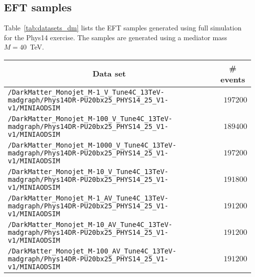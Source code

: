 \subsection{EFT samples}
Table~\ref{tab:datasets_dm} lists the EFT samples generated using full simulation for the Phys14 exercise. The samples are generated using a mediator mass $M=40$~TeV.
\begin{sidewaystable}[h]
    \centering
    \caption{EFT dark matter samples for axial-vector and axial couplings using a mediator mass $M=40$~TeV \label{tab:datasets_dm}}
    \begin{tabular}{lr}
      \hline\hline
      \multicolumn{1}{c}{Data set}&\multicolumn{1}{c}{\# events}\tabularnewline
      \hline
      {\footnotesize \verb!/DarkMatter_Monojet_M-1_V_Tune4C_13TeV-madgraph/Phys14DR-PU20bx25_PHYS14_25_V1-v1/MINIAODSIM!   } &$197200$\tabularnewline
      {\footnotesize \verb!/DarkMatter_Monojet_M-100_V_Tune4C_13TeV-madgraph/Phys14DR-PU20bx25_PHYS14_25_V1-v1/MINIAODSIM! } &$189400$\tabularnewline
      {\footnotesize \verb!/DarkMatter_Monojet_M-1000_V_Tune4C_13TeV-madgraph/Phys14DR-PU20bx25_PHYS14_25_V1-v1/MINIAODSIM!} &$197200$\tabularnewline
      {\footnotesize \verb!/DarkMatter_Monojet_M-10_V_Tune4C_13TeV-madgraph/Phys14DR-PU20bx25_PHYS14_25_V1-v1/MINIAODSIM!  } &$191800$\tabularnewline
      {\footnotesize \verb!/DarkMatter_Monojet_M-1_AV_Tune4C_13TeV-madgraph/Phys14DR-PU20bx25_PHYS14_25_V1-v1/MINIAODSIM!  } &$191200$\tabularnewline
      {\footnotesize \verb!/DarkMatter_Monojet_M-10_AV_Tune4C_13TeV-madgraph/Phys14DR-PU20bx25_PHYS14_25_V1-v1/MINIAODSIM! } &$191200$\tabularnewline
      {\footnotesize \verb!/DarkMatter_Monojet_M-100_AV_Tune4C_13TeV-madgraph/Phys14DR-PU20bx25_PHYS14_25_V1-v1/MINIAODSIM!} &$191200$\tabularnewline
\hline
\end{tabular}
\end{sidewaystable}


